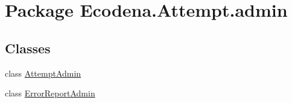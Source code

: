 \hypertarget{namespace_ecodena_1_1_attempt_1_1admin}{
\section{Package Ecodena.Attempt.admin}
\label{dd/d70/namespace_ecodena_1_1_attempt_1_1admin}
}
\subsection*{Classes}
\begin{DoxyCompactItemize}
\item 
class \hyperlink{class_ecodena_1_1_attempt_1_1admin_1_1_attempt_admin}{AttemptAdmin}
\item 
class \hyperlink{class_ecodena_1_1_attempt_1_1admin_1_1_error_report_admin}{ErrorReportAdmin}
\end{DoxyCompactItemize}
